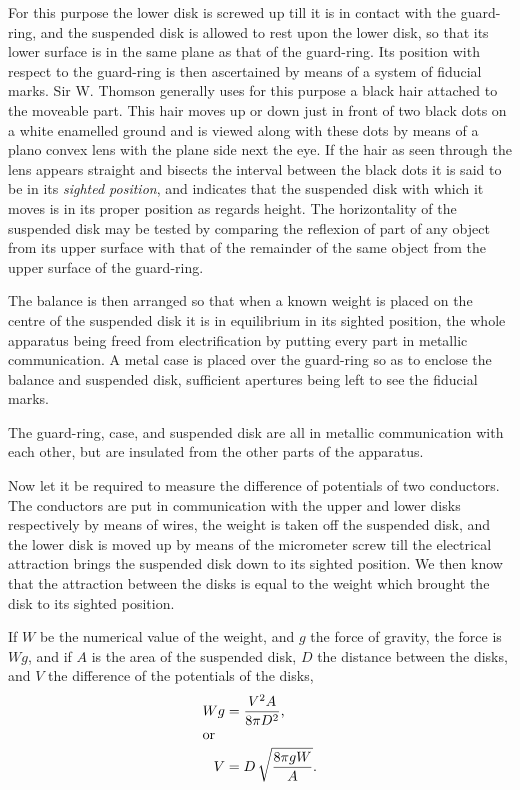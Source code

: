 \documentclass[12pt,oneside]{book}[2021/10/04]
\newcommand{\Runhead}[1]{\fancyhead[C]{\iffloatpage{}{\small#1}}}
\newcommand{\¬}{\hphantom{0}}
\begin{document}
For this purpose the lower disk is screwed up till it is in contact
with the guard-ring, and the suspended disk is allowed to rest
upon the lower disk, so that its lower surface is in the same plane
as that of the guard-ring. Its position with respect to the guard-ring
is then ascertained by means of a system of fiducial marks.
Sir W. Thomson generally uses for this purpose a black hair
attached to the moveable part. This hair moves up or down just
in front of two black dots on a white enamelled ground and is
viewed along with these dots by means of a plano convex lens with
the plane side next the eye. If the hair as seen through the lens
appears straight and bisects the interval between the black dots
it is said to be in its \textit{sighted position}, and indicates that the suspended
disk with which it moves is in its proper position as regards
height. The horizontality of the suspended disk may be tested by
comparing the reflexion of part of any object from its upper surface
with that of the remainder of the same object from the upper
surface of the guard-ring.
\Runhead{ABSOLUTE ELECTROMETER.}

The balance is then arranged so that when a known weight is
placed on the centre of the suspended disk it is in equilibrium
in its sighted position, the whole apparatus being freed from
electrification by putting every part in metallic communication.
A metal case is placed over the guard-ring so as to enclose the
balance and suspended disk, sufficient apertures being left to see
the fiducial marks.

The guard-ring, case, and suspended disk are all in metallic
communication with each other, but are insulated from the other
parts of the apparatus.

Now let it be required to measure the difference of potentials
of two conductors. The conductors are put in communication with
the upper and lower disks respectively by means of wires, the
weight is taken off the suspended disk, and the lower disk is
moved up by means of the micrometer screw till the electrical
attraction brings the suspended disk down to its sighted position.
We then know that the attraction between the disks is equal to
the weight which brought the disk to its sighted position.

If \(W\) be the numerical value of the weight, and \(g\) the force of
gravity, the force is \(Wg\), and if \(A\) is the area of the suspended
disk, \(D\) the distance between the disks, and \(V\) the difference of the
potentials of the disks,
\begin{align*}
Wg &= \frac{V^2A}{8 \pi D^2}\text{,}\\
\shortintertext{or}
V &= D\, \sqrt{\frac{8 \pi gW}{A}}\text{.}
\end{align*}
\end{document}
